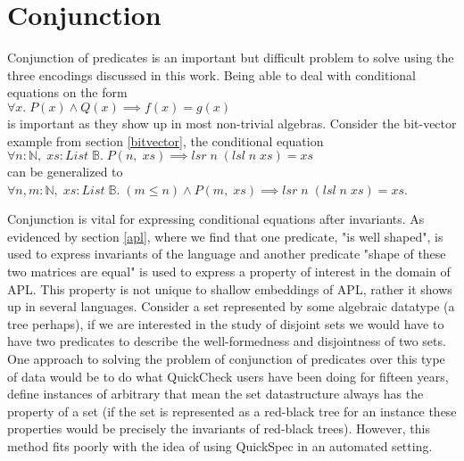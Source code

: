 \section{Conjunction}\label{conjunction}
Conjunction of predicates is an important
but difficult problem to solve using the three
encodings discussed in this work.
Being able to deal with conditional equations on the form
\\$\forall x.\;P(x)\wedge Q(x)\implies f(x)=g(x)$\\
is important as they show up in most non-trivial
algebras. Consider the bit-vector example from section
\ref{bitvector}, the conditional equation
\\$\forall n:\mathbb{N},\;xs:List\;\mathbb{B}.\;P(n,\;xs)\implies lsr\;n\;(lsl\;n\;xs)=xs$\\
can be generalized to
\\$\forall n,m:\mathbb{N},\;xs:List\;\mathbb{B}.\;(m\leq n)\wedge P(m,\;xs)\implies lsr\;n\;(lsl\;n\;xs)=xs$.

Conjunction is vital for expressing conditional equations after invariants.
As evidenced by section \ref{apl}, where we find that one predicate, "is well shaped",
is used to express invariants of the language and another predicate "shape of these two matrices
are equal" is used to express a property of interest in the domain of APL.
This property is not unique to shallow embeddings of APL, rather it shows up in several languages.
Consider a set represented by some algebraic datatype (a tree perhaps), if we are interested
in the study of disjoint sets we would have to have two predicates to describe the well-formedness
and disjointness of two sets. One approach to solving the problem of conjunction of predicates over this
type of data would be to do what QuickCheck users have been doing for fifteen years, define instances
of arbitrary that mean the set datastructure always has the property of a set (if the set is represented
as a red-black tree for an instance these properties would be precisely the invariants of red-black trees). 
However, this method fits poorly with the idea of using QuickSpec in an automated setting.


